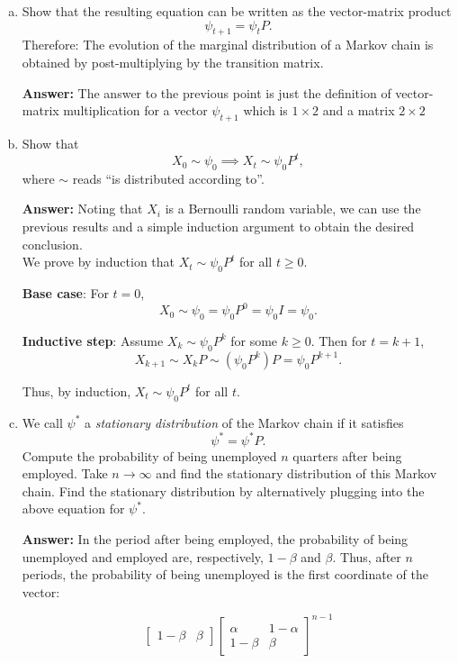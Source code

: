 \documentclass[11pt]{extarticle}
\theoremstyle{plain}
\theoremstyle{definition}
\begin{document}
\begin{enumerate}[(a)]
\item Show that the resulting equation can be written as the vector-matrix product
\begin{equation*}
	\psi_{t+1} = \psi_t P.
\end{equation*}
Therefore: The evolution of the marginal distribution of a Markov chain is obtained by post-multiplying by the transition matrix. 

\textbf{Answer:} The answer to the previous point is just the definition of vector-matrix multiplication for a vector $\psi_{t+1}$ which is $1\times2$ and a matrix $2\times 2$
\item Show that
\begin{equation*}
	X_0 \sim \psi_0 \implies X_t \sim \psi_0 P^t,
\end{equation*}
where $\sim$ reads ``is distributed according to''. 

\textbf{Answer:} Noting that $X_i$ is a Bernoulli random variable, we can use the previous results and a simple induction argument to obtain the desired conclusion.  
\\
We prove by induction that \( X_t \sim \psi_0 P^t \) for all \( t \geq 0 \).

\textbf{Base case}: For \( t = 0 \),
\[
X_0 \sim \psi_0 = \psi_0 P^0 =  \psi_0 I = \psi_0.
\]

\textbf{Inductive step}: Assume \( X_k \sim \psi_0 P^k \) for some \( k \geq 0 \). Then for \( t = k + 1 \),
\[
X_{k+1} \sim X_k P \sim (\psi_0 P^k) P = \psi_0 P^{k+1}.
\]

Thus, by induction, \( X_t \sim \psi_0 P^t \) for all \( t \).

\item We call $\psi^*$ a \textit{stationary distribution} of the Markov chain if it satisfies 
\begin{equation*}
	\psi^* = \psi^* P.
\end{equation*}
Compute the probability of being unemployed $n$ quarters after being employed. Take $n \to \infty$ and find the stationary distribution of this Markov chain. Find the stationary distribution by alternatively plugging into the above equation for $\psi^*$. 

\textbf{Answer:} In the period after being employed, the probability of being unemployed and employed are, respectively, \(1 - \beta\) and \(\beta\). Thus, after \(n\) periods, the probability of being unemployed is the first coordinate of the vector:

\[
\begin{bmatrix} 1 - \beta & \beta \end{bmatrix} \begin{bmatrix} \alpha & 1 - \alpha \\ 1 - \beta & \beta \end{bmatrix}^{n-1}
\]


\end{enumerate}
\end{document}
